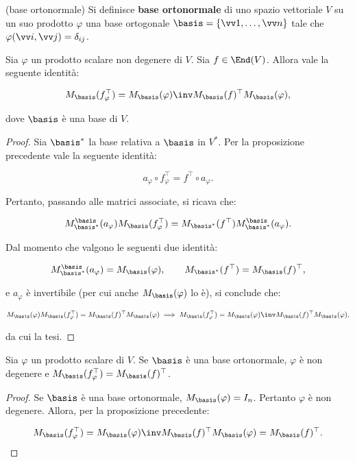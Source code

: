 \documentclass[11pt]{article}
\begin{document}
	\begin{definition} (base ortonormale)
		Si definisce \textbf{base ortonormale} di uno spazio vettoriale $V$ su un suo prodotto $\varphi$
		una base ortogonale $\basis = \{ \vv 1, \ldots, \vv n \}$ tale che $\varphi(\vv i, \vv j) = \delta_{ij}$.
	\end{definition}

	\begin{proposition}
		Sia $\varphi$ un prodotto scalare non degenere di $V$. Sia $f \in \End(V)$. Allora
		vale la seguente identità:
		
		\[ M_\basis(f_\varphi^\top) = M_\basis(\varphi)\inv M_\basis(f)^\top M_\basis(\varphi), \]
		
		dove $\basis$ è una base di $V$.
	\end{proposition}

	\begin{proof}
		Sia $\basis^*$ la base relativa a $\basis$ in $V^*$. Per la proposizione precedente vale la seguente identità:
		
		\[ a_\varphi \circ f_\varphi^\top = f^\top \circ a_\varphi. \]
		
		Pertanto, passando alle matrici associate, si ricava che:
		
		\[ M_{\basis^*}^\basis(a_\varphi) M_\basis(f_\varphi^\top) = M_{\basis^*}(f^\top) M_{\basis^*}^\basis(a_\varphi). \]
		
		Dal momento che valgono le seguenti due identità:
		
		\[ M_{\basis^*}^\basis(a_\varphi) = M_\basis(\varphi), \qquad M_{\basis^*}(f^\top) = M_\basis(f)^\top, \]
		
		e $a_\varphi$ è invertibile (per cui anche $M_\basis(\varphi)$ lo è), si conclude che:
		
		\[ M_\basis(\varphi) M_\basis(f_\varphi^\top) = M_\basis(f)^\top M_\basis(\varphi) \implies M_\basis(f_\varphi^\top) = M_\basis(\varphi)\inv M_\basis(f)^\top M_\basis(\varphi), \]
		
		da cui la tesi.
	\end{proof}

	\begin{corollary} Sia $\varphi$ un prodotto scalare di $V$.
		Se $\basis$ è una base ortonormale, $\varphi$ è non degenere e $M_\basis(f_\varphi^\top) = M_\basis(f)^\top$.
	\end{corollary}

	\begin{proof}
		Se $\basis$ è una base ortonormale, $M_\basis(\varphi) = I_n$. Pertanto $\varphi$ è
		non degenere. Allora, per la proposizione precedente:
		
		\[ M_\basis(f_\varphi^\top) = M_\basis(\varphi)\inv M_\basis(f)^\top M_\basis(\varphi) = M_\basis(f)^\top. \]
	\end{proof}
\end{document}
